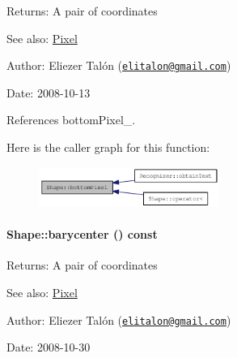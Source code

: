 \begin{Desc}
\item[Returns:]A pair of coordinates\end{Desc}
\begin{Desc}
\item[See also:]\hyperlink{_shape_8hpp_535e59456e3e633842529cfa8ea103c4}{Pixel}\end{Desc}
\begin{Desc}
\item[Author:]Eliezer Talón (\href{mailto:elitalon@gmail.com}{\tt elitalon@gmail.com}) \end{Desc}
\begin{Desc}
\item[Date:]2008-10-13 \end{Desc}


References bottomPixel\_\-.

Here is the caller graph for this function:\nopagebreak
\begin{figure}[H]
\begin{center}
\leavevmode
\includegraphics[width=167pt]{class_shape_99293804122214fa366d7f7ae794d077_icgraph}
\end{center}
\end{figure}
\hypertarget{class_shape_a935b8870ea61569990b304b77513923}{
\paragraph[barycenter]{ Shape::barycenter () const}\hfill}
\label{class_shape_a935b8870ea61569990b304b77513923}


\begin{Desc}
\item[Returns:]A pair of coordinates\end{Desc}
\begin{Desc}
\item[See also:]\hyperlink{_shape_8hpp_535e59456e3e633842529cfa8ea103c4}{Pixel}\end{Desc}
\begin{Desc}
\item[Author:]Eliezer Talón (\href{mailto:elitalon@gmail.com}{\tt elitalon@gmail.com}) \end{Desc}
\begin{Desc}
\item[Date:]2008-10-30 \end{Desc}


